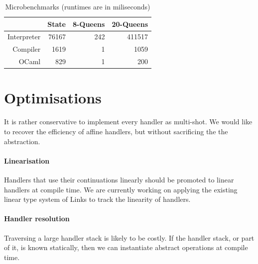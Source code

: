 \documentclass[preprint,numbers]{sigplanconf}
\newcommand{\msgbox}[2]{{%
  \par\noindent\small\color{red}%
  \framebox{\parbox{\dimexpr\linewidth-2\fboxsep-2\fboxrule}{\textbf{#1:} #2}}%
}}
\newcommand{\kc}[1]{\msgbox{KC}{#1}}
\begin{document}

\begin{table}
  \centering
  \begin{tabular}{| r | r | r | r |}
    \hline
                & State & 8-Queens & 20-Queens   \\
    \hline
    Interpreter &  76167&     242  &     411517  \\
    \hline
    Compiler    &  1619 &        1 &      1059  \\
    \hline
    OCaml       &  829  &        1 &       200  \\
    \hline
  \end{tabular}\caption{Microbenchmarks (runtimes are in miliseconds)}\label{tbl:benchmarks}
\end{table}

\section{Optimisations}
It is rather conservative to implement every handler as multi-shot. We
would like to recover the efficiency of affine handlers, but without
sacrificing the the abstraction.

\paragraph{Linearisation}
Handlers that use their continuations linearly should be promoted to
linear handlers at compile time. We are currently working on applying
the existing linear type system of Links to track the linearity of
handlers.

\paragraph{Handler resolution}
Traversing a large handler stack is likely to be costly. If the
handler stack, or part of it, is known statically, then we can
instantiate abstract operations at compile time.
\end{document}

